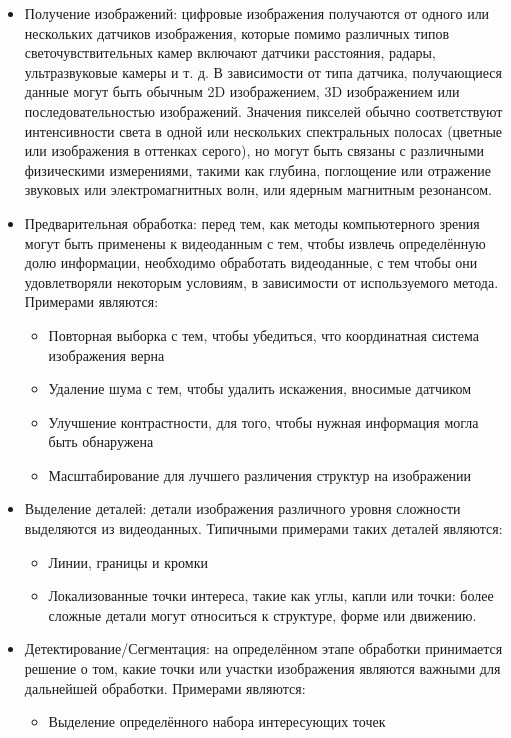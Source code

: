 \documentclass[a4paper,14pt]{extreport}
\begin{document}
\begin{itemize}
	\item Получение изображений: цифровые изображения получаются от одного или нескольких датчиков изображения, которые помимо различных типов светочувствительных камер включают датчики расстояния, радары, ультразвуковые камеры и т. д. В зависимости от типа датчика, получающиеся данные могут быть обычным 2D изображением, 3D изображением или последовательностью изображений. Значения пикселей обычно соответствуют интенсивности света в одной или нескольких спектральных полосах (цветные или изображения в оттенках серого), но могут быть связаны с различными физическими измерениями, такими как глубина, поглощение или отражение звуковых или электромагнитных волн, или ядерным магнитным резонансом.
	\item Предварительная обработка: перед тем, как методы компьютерного зрения могут быть применены к видеоданным с тем, чтобы извлечь определённую долю информации, необходимо обработать видеоданные, с тем чтобы они удовлетворяли некоторым условиям, в зависимости от используемого метода. Примерами являются:
	\begin{itemize}
		\item Повторная выборка с тем, чтобы убедиться, что координатная система изображения верна
		\item Удаление шума с тем, чтобы удалить искажения, вносимые датчиком
		\item Улучшение контрастности, для того, чтобы нужная информация могла быть обнаружена
		\item Масштабирование для лучшего различения структур на изображении
	\end{itemize}
	\item Выделение деталей: детали изображения различного уровня сложности выделяются из видеоданных. Типичными примерами таких деталей являются:
	\begin{itemize}
		\item Линии, границы и кромки
		\item Локализованные точки интереса, такие как углы, капли или точки: более сложные детали могут относиться к структуре, форме или движению.
	\end{itemize}
	\item Детектирование/Сегментация: на определённом этапе обработки принимается решение о том, какие точки или участки изображения являются важными для дальнейшей обработки. Примерами являются:
	\begin{itemize}
		\item Выделение определённого набора интересующих точек

\end{itemize}
\end{itemize}
\end{document}
